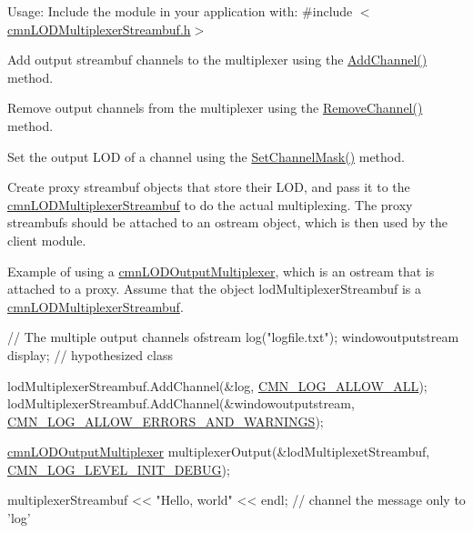 Usage\-: Include the module in your application with\-: \#include $<$\hyperlink{cmn_l_o_d_multiplexer_streambuf_8h}{cmn\-L\-O\-D\-Multiplexer\-Streambuf.\-h}$>$

Add output streambuf channels to the multiplexer using the \hyperlink{classcmn_l_o_d_multiplexer_streambuf_a13062543394fee2e08419f0ecad3b5c1}{Add\-Channel()} method.

Remove output channels from the multiplexer using the \hyperlink{classcmn_l_o_d_multiplexer_streambuf_ab1c5504083f7074b012335f38593f7c2}{Remove\-Channel()} method.

Set the output L\-O\-D of a channel using the \hyperlink{classcmn_l_o_d_multiplexer_streambuf_a963eadbf72872649aa91d2ab59d2c433}{Set\-Channel\-Mask()} method.

Create proxy streambuf objects that store their L\-O\-D, and pass it to the \hyperlink{classcmn_l_o_d_multiplexer_streambuf}{cmn\-L\-O\-D\-Multiplexer\-Streambuf} to do the actual multiplexing. The proxy streambufs should be attached to an ostream object, which is then used by the client module.

Example of using a \hyperlink{classcmn_l_o_d_output_multiplexer}{cmn\-L\-O\-D\-Output\-Multiplexer}, which is an ostream that is attached to a proxy. Assume that the object lod\-Multiplexer\-Streambuf is a \hyperlink{classcmn_l_o_d_multiplexer_streambuf}{cmn\-L\-O\-D\-Multiplexer\-Streambuf}.


\begin{DoxyCode}
 \textcolor{comment}{// The multiple output channels}
ofstream log(\textcolor{stringliteral}{"logfile.txt"});
windowoutputstream display;    \textcolor{comment}{// hypothesized class}

lodMultiplexerStreambuf.AddChannel(&log, \hyperlink{cmn_log_lo_d_8h_acf03c43c8a0fbe1c13b2aa4ac3b0a856}{CMN\_LOG\_ALLOW\_ALL});
lodMultiplexerStreambuf.AddChannel(&windowoutputstream, 
      \hyperlink{cmn_log_lo_d_8h_a4414b84b0d7c28e5df5728224b987125}{CMN\_LOG\_ALLOW\_ERRORS\_AND\_WARNINGS});

\hyperlink{classcmn_l_o_d_output_multiplexer}{cmnLODOutputMultiplexer} multiplexerOutput(&lodMultiplexetStreambuf, 
      \hyperlink{cmn_log_lo_d_8h_a27e55e3638c78366331ee3c1ca3d60ef}{CMN\_LOG\_LEVEL\_INIT\_DEBUG});

multiplexerStreambuf << \textcolor{stringliteral}{"Hello, world"} << endl;  \textcolor{comment}{// channel the message only to 'log'}
\end{DoxyCode}


